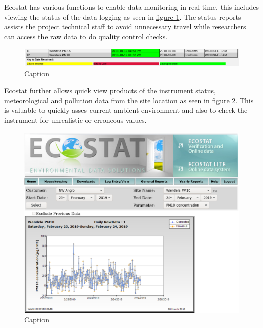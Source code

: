 \documentclass{nwureport}
\begin{document}
Ecostat has various functions to enable data monitoring in real-time, this includes
viewing the status of the data logging as seen in \hyperref[fig:ecostat_status]{figure \ref{fig:ecostat_status}}. The status reports assists the project technical staff to avoid
unnecessary travel while researchers can access the raw data to do quality control checks. 

\begin{figure}[!htb]
    \centering
    \includegraphics[width=\textwidth]{images/ecstat_status.png}
    \caption[Ecostat.co.za status report]{Caption}
    \label{fig:ecostat_status}
\end{figure}

Ecostat further allows quick view products of the instrument status,
meteorological and pollution data from the site location as seen
in \hyperref[fig:ecostat_quick]{figure \ref{fig:ecostat_quick}}. This is
valuable to quickly asses current ambient environment and also to check the
instrument for unrealistic or erroneous values.

\begin{figure}[!htb]
    \centering
    \includegraphics[width=\textwidth]{images/ecostat_quick.png}
    \caption[Ecostat.co.za quick view]{Caption}
    \label{fig:ecostat_quick}
\end{figure}
\end{document}
